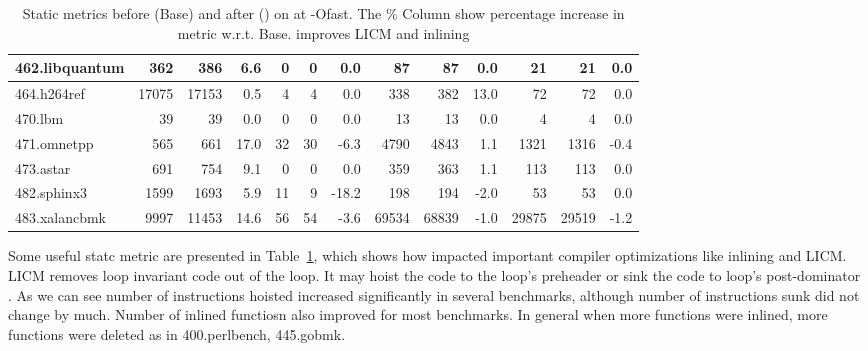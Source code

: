 \documentclass[acmlarge,review,anonymous]{acmart}\settopmatter{printfolios=true}
\begin{document}
\begin{table}[h!]
\begin{center}
\begin{tabular}{|l|r|r|r|r|r|r|r|r|r|r|r|r|}
 462.libquantum	  & 362	        & 386	& 6.6 & 0 	& 0	& 0.0  & 87	& 87	  & 0.0 & 21	& 21	& 0.0  \\\hline
 464.h264ref	  & 17075	& 17153	& 0.5 & 4	& 4	& 0.0  & 338	& 382	  & 13.0& 72	& 72	& 0.0  \\\hline
 470.lbm	  & 39	        & 39	& 0.0 & 0	& 0	& 0.0  & 13	& 13	  & 0.0 & 4	& 4	& 0.0  \\\hline
 471.omnetpp	  & 565	        & 661	& 17.0& 32	& 30	& -6.3 & 4790	& 4843	  & 1.1 & 1321	& 1316	& -0.4 \\\hline
 473.astar	  & 691	        & 754	& 9.1 & 0	& 0	& 0.0  & 359	& 363	  & 1.1 & 113	& 113	& 0.0  \\\hline
 482.sphinx3	  & 1599	& 1693	& 5.9 & 11	& 9	& -18.2& 198	& 194	  & -2.0& 53	& 53	& 0.0  \\\hline
 483.xalancbmk	  & 9997	& 11453	& 14.6& 56	& 54	& -3.6 & 69534	& 68839	  & -1.0& 29875	& 29519	& -1.2 \\\hline
    \end{tabular}
  \end{center}
  \caption{Static metrics before (Base) and after \gcm{} (\GCM{}) on
    \SPEC{} at -Ofast. The \% Column show percentage increase in metric
    w.r.t. Base. \GCM{} improves LICM and inlining}
  \label{tab:stats}
\end{table}

Some useful statc metric are presented in Table~\ref{tab:stats}, which shows how \gcm{}
impacted important compiler optimizations like inlining and LICM. LICM removes loop invariant
code out of the loop. It may hoist the code to the loop's preheader or sink the code to loop's
post-dominator \cite{steven1997advanced}. As we can see number of instructions hoisted increased
significantly in several benchmarks, although number of instructions sunk did not change by much.
Number of inlined functiosn also improved for most benchmarks. In general when more functions
were inlined, more functions were deleted as in 400.perlbench, 445.gobmk.
\end{document}
